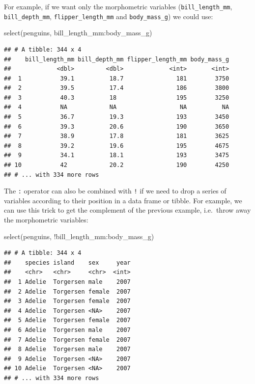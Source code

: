 \documentclass[
]{book}
\newenvironment{Shaded}{\begin{snugshade}}{\end{snugshade}}
\newcommand{\FunctionTok}[1]{\textcolor[rgb]{0.00,0.00,0.00}{#1}}
\newcommand{\NormalTok}[1]{#1}
\newcommand{\SpecialCharTok}[1]{\textcolor[rgb]{0.00,0.00,0.00}{#1}}
\begin{document}
For example, if we want only the morphometric variables (\texttt{bill\_length\_mm}, \texttt{bill\_depth\_mm}, \texttt{flipper\_length\_mm} and \texttt{body\_mass\_g}) we could use:

\begin{Shaded}
\begin{Highlighting}[]
\FunctionTok{select}\NormalTok{(penguins, bill\_length\_mm}\SpecialCharTok{:}\NormalTok{body\_mass\_g)}
\end{Highlighting}
\end{Shaded}

\begin{verbatim}
## # A tibble: 344 x 4
##    bill_length_mm bill_depth_mm flipper_length_mm body_mass_g
##             <dbl>         <dbl>             <int>       <int>
##  1           39.1          18.7               181        3750
##  2           39.5          17.4               186        3800
##  3           40.3          18                 195        3250
##  4           NA            NA                  NA          NA
##  5           36.7          19.3               193        3450
##  6           39.3          20.6               190        3650
##  7           38.9          17.8               181        3625
##  8           39.2          19.6               195        4675
##  9           34.1          18.1               193        3475
## 10           42            20.2               190        4250
## # ... with 334 more rows
\end{verbatim}

The \texttt{:} operator can also be combined with \texttt{!} if we need to drop a series of variables according to their position in a data frame or tibble. For example, we can use this trick to get the complement of the previous example, i.e.~throw away the morphometric variables:

\begin{Shaded}
\begin{Highlighting}[]
\FunctionTok{select}\NormalTok{(penguins, }\SpecialCharTok{!}\NormalTok{bill\_length\_mm}\SpecialCharTok{:}\NormalTok{body\_mass\_g)}
\end{Highlighting}
\end{Shaded}

\begin{verbatim}
## # A tibble: 344 x 4
##    species island    sex     year
##    <chr>   <chr>     <chr>  <int>
##  1 Adelie  Torgersen male    2007
##  2 Adelie  Torgersen female  2007
##  3 Adelie  Torgersen female  2007
##  4 Adelie  Torgersen <NA>    2007
##  5 Adelie  Torgersen female  2007
##  6 Adelie  Torgersen male    2007
##  7 Adelie  Torgersen female  2007
##  8 Adelie  Torgersen male    2007
##  9 Adelie  Torgersen <NA>    2007
## 10 Adelie  Torgersen <NA>    2007
## # ... with 334 more rows
\end{verbatim}
\end{document}
